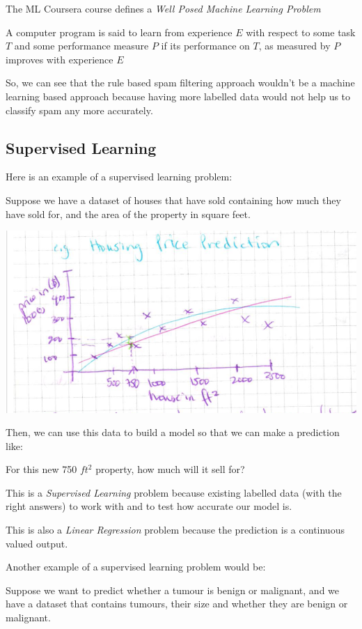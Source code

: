 \documentclass[12pt]{article}
\begin{document}
The ML Coursera course defines a \textit{Well Posed Machine Learning Problem}

A computer program is said to learn from experience $E$ with respect to some task $T$ and some performance measure $P$ 
if its performance on $T$, as measured by $P$ improves with experience $E$

So, we can see that the rule based spam filtering approach wouldn't be a machine learning based approach because having 
more labelled data would not help us to classify spam any more accurately.

\subsection{Supervised Learning}

Here is an example of a supervised learning problem: 

Suppose we have a dataset of houses that have sold containing how much they have sold for, and the area of the property in square feet. 

\includegraphics[width={\textwidth}]{housing-prices}

Then, we can use this data to build a model so that we can make a prediction like:

For this new 750 $ft^2$ property, how much will it sell for?

This is a \textit{Supervised Learning} problem because existing labelled data (with the right answers) to work with and to test how accurate our model is.

This is also a \textit{Linear Regression} problem because the prediction is a continuous valued output. 

Another example of a supervised learning problem would be:

Suppose we want to predict whether a tumour is benign or malignant, and we have a dataset that contains tumours, their size and whether they are benign or malignant.
\end{document}

